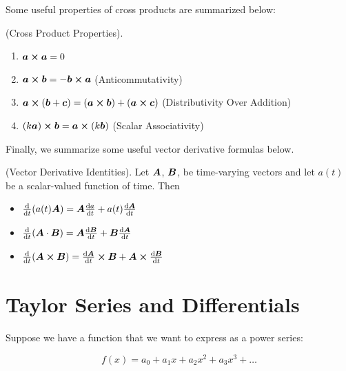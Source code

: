 \documentclass[openany,oneside]{book}
\begin{document}
 Some useful properties of cross products are summarized below: 

 \begin{theorem}
  (Cross Product Properties). \    
    
\begin{enumerate}
  \item $\bm{a} \cross \bm{a} = 0$ 
  \item $\bm{a} \cross \bm{b} = - \bm{b} \cross \bm{a} $ (Anticommutativity) 
  \item $\bm{a} \cross (\bm{b} + \bm{c}) = (\bm{a} \cross \bm{b}) + (\bm{a} \cross \bm{c})$ (Distributivity Over Addition)
  \item $(k\bm{a}) \cross \bm{b} = \bm{a} \cross (k\bm{b}) $ (Scalar Associativity)
  
\end{enumerate}
 \end{theorem}
 


Finally, we summarize some useful vector derivative formulas below.

\begin{definition}

    (Vector Derivative Identities). Let $\vect{A}$, $\vect{B}$, be time-varying vectors and let
    $a(t)$ be a scalar-valued function of time. Then \
   \begin{itemize}
    \centering
    \item $\dv{t}(a(t)\vect{A}) = \vect{A} \dv{a}{t} + a(t)\dv{\vect{A}}{t}$
     
    \item $\dv{t}(\vect{A} \cdot \vect{B}) = \vect{A} \dv{\vect{B}}{t} + \vect{B}\dv{\vect{A}}{t}$

    \item $\dv{t}(\vect{A} \cross \vect{B}) = \dv{\vect{A}}{t}\cross\vect{B} +  \vect{A} \cross \dv{\vect{B}}{t}$
   \end{itemize} 
    
\end{definition}


\section{Taylor Series and Differentials}

Suppose we have a function that we want to express as a power series: 

\[
f(x) = a_0 + a_1 x + a_2 x^2 + a_3 x^3 + \dots
    \]
\end{document}
